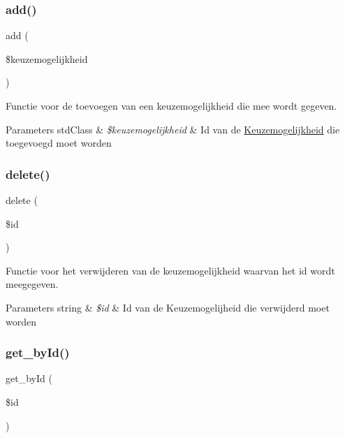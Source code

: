 \subsubsection{\texorpdfstring{add()}{add()}}
{\footnotesize\ttfamily add (\begin{DoxyParamCaption}\item[{}]{\$keuzemogelijkheid }\end{DoxyParamCaption})}



Functie voor de toevoegen van een keuzemogelijkheid die mee wordt gegeven. 


\begin{DoxyParams}[1]{Parameters}
std\+Class & {\em \$keuzemogelijkheid} & Id van de \mbox{\hyperlink{class_keuzemogelijkheid}{Keuzemogelijkheid}} die toegevoegd moet worden \\
\hline
\end{DoxyParams}
\mbox{\label{class_keuzemogelijkheid___model_a2f8258add505482d7f00ea26493a5723}} 
\subsubsection{\texorpdfstring{delete()}{delete()}}
{\footnotesize\ttfamily delete (\begin{DoxyParamCaption}\item[{}]{\$id }\end{DoxyParamCaption})}



Functie voor het verwijderen van de keuzemogelijkheid waarvan het id wordt meegegeven. 


\begin{DoxyParams}[1]{Parameters}
string & {\em \$id} & Id van de Keuzemogelijheid die verwijderd moet worden \\
\hline
\end{DoxyParams}
\mbox{\label{class_keuzemogelijkheid___model_a98d28a4d9a29d40c5a8aa0176f19a919}} 
\subsubsection{\texorpdfstring{get\+\_\+by\+Id()}{get\_byId()}}
{\footnotesize\ttfamily get\+\_\+by\+Id (\begin{DoxyParamCaption}\item[{}]{\$id }\end{DoxyParamCaption})}




